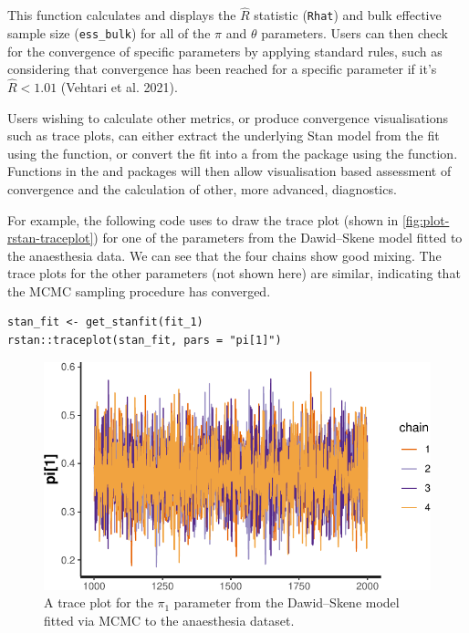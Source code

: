 This function calculates and displays the \(\hat{R}\) statistic (\texttt{Rhat}) and bulk
effective sample size (\texttt{ess\_bulk}) for all of the \(\pi\) and \(\theta\)
parameters. Users can then check for the convergence of specific parameters by
applying standard rules, such as considering that convergence has been reached
for a specific parameter if it's \(\hat{R} < 1.01\) (Vehtari et al. 2021).

Users wishing to calculate other metrics, or produce convergence visualisations
such as trace plots, can either extract the underlying Stan model from the
 fit using the  function, or convert the
fit into a  from the  package using the
 function. Functions in the  and
 packages will then allow visualisation based assessment of
convergence and the calculation of other, more advanced, diagnostics.

For example, the following code uses  to draw the trace plot
(shown in \autoref{fig:plot-rstan-traceplot}) for one of the parameters from
the Dawid--Skene model fitted to the anaesthesia data. We can see that the
four chains show good mixing. The trace plots for the other parameters
(not shown here) are similar, indicating that the MCMC sampling procedure has
converged.

\begin{verbatim}
stan_fit <- get_stanfit(fit_1)
rstan::traceplot(stan_fit, pars = "pi[1]")
\end{verbatim}

\begin{figure}

{\centering \includegraphics{RJ-2023-064_files/figure-latex/plot-rstan-traceplot-1} 

}

\caption{A trace plot for the $\pi_1$ parameter from the Dawid--Skene model fitted via MCMC to the anaesthesia dataset.}\label{fig:plot-rstan-traceplot}
\end{figure}

